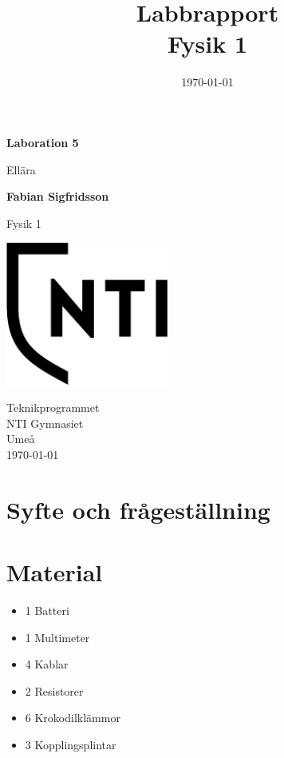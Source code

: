 \documentclass[11p]{article}
\title{Labbrapport \\ \small Fysik 1}
\author{\name}
\date{\today}
\def\name{Fabian Sigfridsson}
\begin{document}

    \begin{titlepage}
        \begin{center}
            \vspace*{1cm}

            \Huge
            \textbf{Laboration 5}

            \vspace{0.5cm}
            \LARGE
            Ellära

            \vspace{1.5cm}

            \textbf{\name}

            \vfill


            Fysik 1

            \vspace{0.8cm}

            \includegraphics[width=0.4\textwidth]{images/NTI_Gymnasiet_Symbol_print_svart}

            \Large
            Teknikprogrammet\\
            NTI Gymnasiet\\
            Umeå\\
            \today

        \end{center}
    \end{titlepage}
    \section{Syfte och frågeställning}
    \section{Material}
        \begin{itemize}
            \item 1 Batteri
            \item 1 Multimeter
            \item 4 Kablar
            \item 2 Resistorer
            \item 6 Krokodilklämmor
            \item 3 Kopplingsplintar
        \end{itemize}
\end{document}
